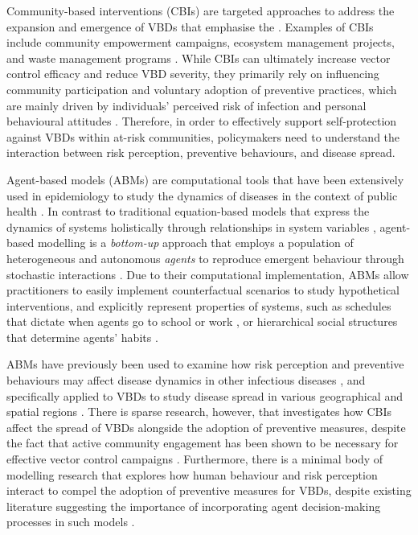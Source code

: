 Community-based interventions (CBIs) are targeted approaches to address the expansion and emergence of VBDs that emphasise the  \cite{bardosh_addressing_2017}. Examples of CBIs include community empowerment campaigns, ecosystem management projects, and waste management programs \cite{perez_realist_2021}. While CBIs can ultimately increase vector control efficacy and reduce VBD severity, they primarily rely on influencing community participation and voluntary adoption of preventive practices, which are mainly driven by individuals' perceived risk of infection and personal behavioural attitudes \cite{brewer_risk_2004, raude_public_2012, lopes-rafegas_contribution_2023}. Therefore, in order to effectively support self-protection against VBDs within at-risk communities, policymakers need to understand the interaction between risk perception, preventive behaviours, and disease spread.

Agent-based models (ABMs) are computational tools that have been extensively used in epidemiology to study the dynamics of diseases in the context of public health \cite{tracy_agent-based_2018, speybroeck_simulation_2013}. In contrast to traditional equation-based models that express the dynamics of systems holistically through relationships in system variables \cite{van_dyke_parunak_agent-based_1998}, agent-based modelling is a \textit{bottom-up} approach that employs a population of heterogeneous and autonomous \textit{agents} to reproduce emergent behaviour through stochastic interactions \cite{epstein_growing_1996}. Due to their computational implementation, ABMs allow practitioners to easily implement counterfactual scenarios to study hypothetical interventions, and explicitly represent properties of systems, such as schedules that dictate when agents go to school or work \cite{pangallo_unequal_2023}, or hierarchical social structures that determine agents' habits \cite{xu_synthetic_2017}.

ABMs have previously been used to examine how risk perception and preventive behaviours may affect disease dynamics in other infectious diseases \cite{abdulkareem_risk_2020, mao_modeling_2014, kandiah_empirical_2017, du_how_2021, tully_coevolution_2013, andrews_disease_2015}, and specifically applied to VBDs to study disease spread in various geographical and spatial regions \cite{krzhizhanovskaya_agent-based_2020, selvaraj_vector_2020, manore_network-patch_2015, linard_multi-agent_2009, jacintho_agent-based_2010, perkins_agent-based_2019, mulyani_agent_2017, maneerat_spatial_2016}. There is sparse research, however, that investigates how CBIs affect the spread of VBDs alongside the adoption of preventive measures, despite the fact that active community engagement has been shown to be necessary for effective vector control campaigns \cite{winch_effectiveness_1992, rivera_adoption_2023}. Furthermore, there is a minimal body of modelling research that explores how human behaviour and risk perception interact to compel the adoption of preventive measures for VBDs, despite existing literature suggesting the importance of incorporating agent decision-making processes in such models \cite{scheidegger_agent-based_2017, mateus_c_modeling_2021}.

